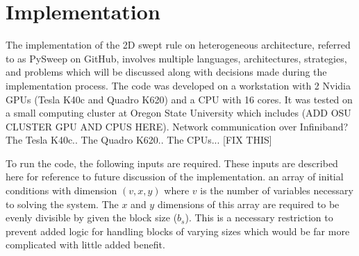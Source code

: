 \documentclass[review]{elsarticle}
\begin{document}
%
%

\section{Implementation}
The implementation of the 2D swept rule on heterogeneous architecture, referred to as PySweep on GitHub, involves multiple languages, architectures, strategies, and problems which will be discussed along with decisions made during the implementation process. The code was developed on a workstation with 2 Nvidia GPUs (Tesla K40c and Quadro K620) and a CPU with 16 cores. It was tested on a small computing cluster at Oregon State University which includes (ADD OSU CLUSTER GPU AND CPUS HERE). Network communication over Infiniband? The Tesla K40c.. The Quadro K620.. The CPUs... [FIX THIS]

\par
To run the code, the following inputs are required. These inputs are described here for reference to future discussion of the implementation.
an array of initial conditions with dimension $(v,x,y)$ where $v$ is the number of variables necessary to solving the system. The $x$ and $y$ dimensions of this array are required to be evenly divisible by given the block size ($b_s$). This is a necessary restriction to prevent added logic for handling blocks of varying sizes which would be far more complicated with little added benefit.
\end{document}
